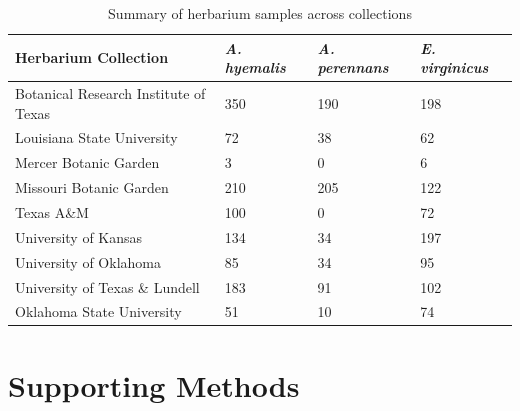 \documentclass[11pt]{article}
\newcommand{\firstrevise}[1]{{\color{black}{#1}}}
\begin{document}
	\begin{table}[h]
		\caption{Summary of herbarium samples across collections \firstrevise{(no. of specimens)}}
		\label{table:herbaria}
		\centering
		\begin{tabular}{llll}\hline
			Herbarium Collection        & \emph{A. hyemalis}        & \emph{A. perennans}      &      \emph{E. virginicus}\\ \hline
			Botanical Research Institute of Texas &   350   &    190&    198    \\
			Louisiana State University &     72  & 38  &   62       \\
			Mercer Botanic Garden &   3    & 0     &     6\\
			Missouri Botanic Garden& 210 & 205 & 122\\
		    Texas A\&M &  100 &0 & 72 \\
		    University of Kansas & 134 & 34 &  197\\
		    University of Oklahoma & 85 &34&  95\\
		    University of Texas  \& Lundell   &  183& 91& 102\\		    				 			     			     
			Oklahoma State University&     51  &   10    &  74 \\ \hline
		\end{tabular}
		\bigskip{}

	\end{table}	
	
	
	\section*{Supporting Methods}
\end{document}
